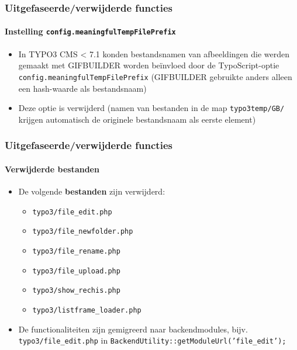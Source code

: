 \begin{frame}[fragile]
	\frametitle{Uitgefaseerde/verwijderde functies}
	\framesubtitle{Instelling \texttt{config.meaningfulTempFilePrefix}}

	\begin{itemize}

		\item In TYPO3 CMS < 7.1 konden bestandsnamen van afbeeldingen die werden gemaakt 
			met GIFBUILDER worden beïnvloed door de TypoScript-optie 
			\texttt{config.meaningfulTempFilePrefix}\newline
			\small
				(GIFBUILDER gebruikte anders alleen een hash-waarde als bestandsnaam)
			\normalsize

		\item Deze optie is verwijderd (namen van bestanden in de map \texttt{typo3temp/GB/}
			krijgen automatisch de originele bestandsnaam als eerste element)

	\end{itemize}

\end{frame}




\begin{frame}[fragile]
	\frametitle{Uitgefaseerde/verwijderde functies}
	\framesubtitle{Verwijderde bestanden}

	\begin{itemize}
		\item De volgende \textbf{bestanden} zijn verwijderd:

			\begin{itemize}
				\item \texttt{typo3/file\_edit.php}
				\item \texttt{typo3/file\_newfolder.php}
				\item \texttt{typo3/file\_rename.php}
				\item \texttt{typo3/file\_upload.php}
				\item \texttt{typo3/show\_rechis.php}
				\item \texttt{typo3/listframe\_loader.php}
			\end{itemize}

		\item De functionaliteiten zijn gemigreerd naar backendmodules,
			bijv. \texttt{typo3/file\_edit.php} in \texttt{BackendUtility::getModuleUrl('file\_edit');}

	\end{itemize}

\end{frame}

